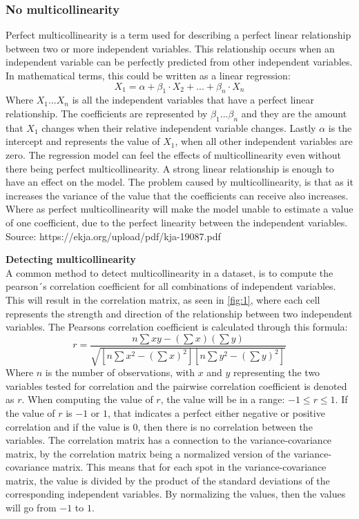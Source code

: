 \subsubsection{No multicollinearity}
Perfect multicollinearity is a term used for describing a perfect linear relationship between two or more independent variables. This relationship occurs when an independent variable can be perfectly predicted from other independent variables. In mathematical terms, this could be written as a linear regression:
\begin{equation}
X_1 = \alpha+\beta_1\cdot X_2+...+\beta_n\cdot X_n
\end{equation}
Where $X_1...X_n$ is all the independent variables that have a perfect linear relationship. The coefficients are represented by $\beta_1...\beta_n$ and they are the amount that $X_1$ changes when their relative independent variable changes.
Lastly $\alpha$ is the intercept and represents the value of $X_1$, when all other independent variables are zero.
\newline
The regression model can feel the effects of multicollinearity even without there being perfect multicollinearity. A strong linear relationship is enough to have an effect on the model. The problem caused by multicollinearity, is that as it increases the variance of the value that the coefficients can receive also increases. Where as perfect multicollinearity will make the model unable to estimate a value of one coefficient, due to the perfect linearity between the independent variables.
\newline
Source: https://ekja.org/upload/pdf/kja-19087.pdf

\noindent \textbf{Detecting multicollinearity}\\
A common method to detect multicollinearity in a dataset, is to compute the pearson´s correlation coefficient for all combinations of independent variables. This will result in the correlation matrix, as seen in \autoref{fig:1}, where each cell represents the strength and direction of the relationship between two independent variables. The Pearsons correlation coefficient is calculated through this formula:
\begin{equation}
r = \frac{n \sum xy - (\sum x)(\sum y)}{\sqrt{[n \sum x^2 - (\sum x)^2][n \sum y^2 - (\sum y)^2]}}
\end{equation}
Where $n$ is the number of observations, with $x$ and $y$ representing the two variables tested for correlation and the pairwise correlation coefficient is denoted as $r$. When computing the value of $r$, the value will be in a range: $-1\leq r \leq 1$. If the value of $r$ is $-1$ or $1$, that indicates a perfect either negative or positive correlation and if the value is $0$, then there is no correlation between the variables. The correlation matrix has a connection to the variance-covariance matrix, by the correlation matrix being a normalized version of the variance-covariance matrix. This means that for each spot in the variance-covariance matrix, the value is divided by the product of the standard deviations of the corresponding independent variables. By normalizing the values, then the values will go from $-1$ to $1$.




